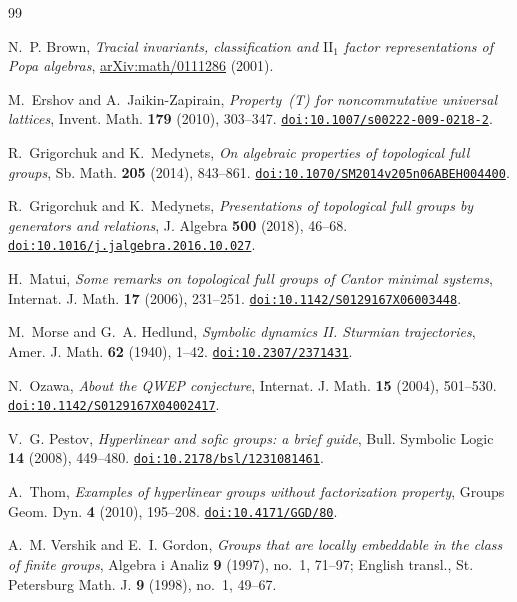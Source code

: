 \documentclass[11pt]{amsart}
\newcommand{\doi}[1]{\href{https://doi.org/#1}{\nolinkurl{doi:#1}}}
\begin{document}
\begin{thebibliography}{99}

N.~P. Brown, \emph{Tracial invariants, classification and
$\mathrm{II}_1$ factor representations of Popa algebras},
\href{https://arxiv.org/abs/math/0111286}{arXiv:math/0111286} (2001).

M.~Ershov and A.~Jaikin-Zapirain,
\emph{Property~\textup{(T)} for noncommutative universal lattices},
Invent. Math. \textbf{179} (2010), 303--347.
\doi{10.1007/s00222-009-0218-2}.

R.~Grigorchuk and K.~Medynets,
\emph{On algebraic properties of topological full groups},
Sb. Math. \textbf{205} (2014), 843--861.
\doi{10.1070/SM2014v205n06ABEH004400}.

R.~Grigorchuk and K.~Medynets,
\emph{Presentations of topological full groups by generators and
relations}, J. Algebra \textbf{500} (2018), 46--68.
\doi{10.1016/j.jalgebra.2016.10.027}.

H.~Matui, \emph{Some remarks on topological full groups of Cantor
minimal systems}, Internat. J. Math. \textbf{17} (2006), 231--251.
\doi{10.1142/S0129167X06003448}.

M.~Morse and G.~A. Hedlund,
\emph{Symbolic dynamics II. Sturmian trajectories},
Amer. J. Math. \textbf{62} (1940), 1--42.
\doi{10.2307/2371431}.

N.~Ozawa, \emph{About the QWEP conjecture},
Internat. J. Math. \textbf{15} (2004), 501--530.
\doi{10.1142/S0129167X04002417}.

V.~G. Pestov, \emph{Hyperlinear and sofic groups: a brief guide},
Bull. Symbolic Logic \textbf{14} (2008), 449--480.
\doi{10.2178/bsl/1231081461}.

A.~Thom, \emph{Examples of hyperlinear groups without factorization
property}, Groups Geom. Dyn. \textbf{4} (2010), 195--208.
\doi{10.4171/GGD/80}.

A.~M. Vershik and E.~I. Gordon,
\emph{Groups that are locally embeddable in the class of finite groups},
Algebra i Analiz \textbf{9} (1997), no.~1, 71--97; English transl.,
St. Petersburg Math. J. \textbf{9} (1998), no.~1, 49--67.

\end{thebibliography}
\end{document}
